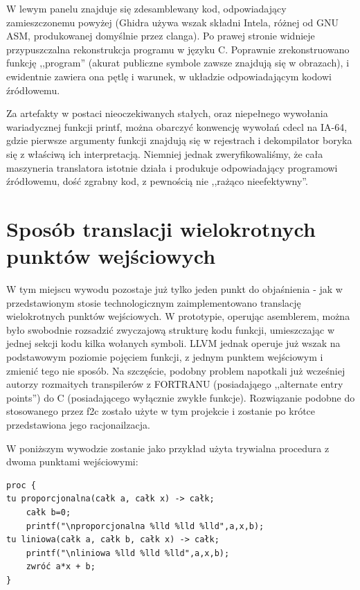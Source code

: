W lewym panelu znajduje się zdesamblewany kod, odpowiadający zamieszczonemu powyżej (Ghidra używa wszak składni Intela, różnej od GNU ASM, produkowanej domyślnie przez clanga). Po prawej stronie widnieje przypuszczalna rekonstrukcja programu w języku C. Poprawnie zrekonstruowano funkcję ,,program'' (akurat publiczne symbole zawsze znajdują się w obrazach), i ewidentnie zawiera ona pętlę i warunek, w układzie odpowiadającym kodowi źródłowemu. 

Za artefakty w postaci nieoczekiwanych stałych, oraz niepełnego wywołania wariadycznej funkcji printf, można obarczyć konwencję wywołań cdecl na IA-64, gdzie pierwsze argumenty funkcji znajdują się w rejestrach i dekompilator boryka się z właściwą ich interpretacją.
Niemniej jednak zweryfikowaliśmy, że cała maszyneria translatora istotnie działa i produkuje odpowiadający programowi źródłowemu, dość zgrabny kod, z pewnością nie ,,rażąco nieefektywny''.

\section{Sposób translacji wielokrotnych punktów wejściowych}
W tym miejscu wywodu pozostaje już tylko jeden punkt do objaśnienia - jak w przedstawionym stosie technologicznym zaimplementowano translację wielokrotnych punktów wejściowych. W prototypie, operując asemblerem, można było swobodnie rozsadzić zwyczajową strukturę kodu funkcji, umieszczając w jednej sekcji kodu kilka wołanych symboli. LLVM jednak operuje już wszak na podstawowym poziomie pojęciem funkcji, z jednym punktem wejściowym i zmienić tego nie sposób. Na szczęście, podobny problem napotkali już wcześniej autorzy rozmaitych transpilerów z FORTRANU (posiadająego ,,alternate entry points'') do C (posiadającego wyłącznie zwykłe funkcje).\cite{gpp_entry_points} Rozwiązanie podobne do stosowanego przez f2c zostało użyte w tym projekcie i zostanie po krótce przedstawiona jego racjonailzacja.

W poniższym wywodzie zostanie jako przykład użyta trywialna procedura z dwoma punktami wejściowymi:
\begin{lstlisting}
proc {
tu proporcjonalna(całk a, całk x) -> całk;
	całk b=0;
	printf("\nproporcjonalna %lld %lld %lld",a,x,b);
tu liniowa(całk a, całk b, całk x) -> całk;
	printf("\nliniowa %lld %lld %lld",a,x,b);
	zwróć a*x + b;
}
\end{lstlisting}

